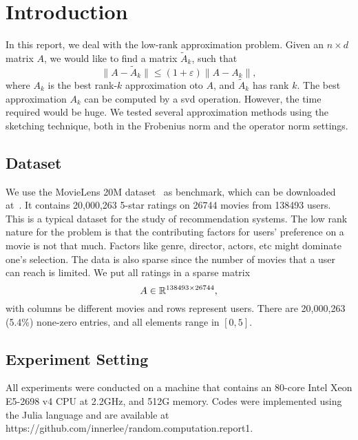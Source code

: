 \section{Introduction}
\label{sec:intro}

In this report, we deal with the low-rank approximation problem.
Given an $n\times d$ matrix $A$,
we would like to find a matrix $\tilde{A}_k$,
such that
\begin{equation}
    \| A - \tilde{A}_k \| \le (1+\varepsilon) \| A - A_k \|,
\end{equation}
where $A_k$ is the best rank-$k$ approximation oto $A$,
and $\tilde{A}_k$ has rank $k$.
The best approximation $A_k$ can be computed by a svd operation.
However, the time required would be huge.
We tested several approximation methods using the sketching technique,
both in the Frobenius norm and the operator norm settings.

\subsection{Dataset}

We use the MovieLens 20M dataset~\cite{lens} as benchmark,
which can be downloaded at~\cite{movielens}.
It contains 20,000,263 5-star ratings on 26744 movies from 138493 users.
This is a typical dataset for the study of recommendation systems.
The low rank nature for the problem is that the contributing factors
for users' preference on a movie is not that much.
Factors like genre, director, actors, etc might dominate one's selection.
The data is also sparse
since the number of movies that a user can reach is limited.
We put all ratings in a sparse matrix
\begin{equation}
    A \in {\mathbb{R}}^{138493\times26744 },
\end{equation}
with columns be different movies and rows represent users.
There are 20,000,263 (5.4\%) none-zero entries,
and all elements range in $[0, 5]$.

\subsection{Experiment Setting}

All experiments were conducted on a machine that contains an 80-core
Intel Xeon E5-2698 v4 CPU at 2.2GHz, and 512G memory.
Codes were implemented using the Julia language and are available at
https://github.com/innerlee/random.computation.report1.
